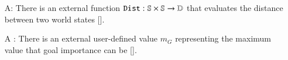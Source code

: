\begin{itemize}
    \item[A\refstepcounter{assumpnum}\theassumpnum \label{A_DistFunction}:]
    There is an external function $\mathtt{Dist} : \mathbb{S} \times
    \mathbb{S} \rightarrow \mathbb{D}$ that evaluates the distance
    between two world states [].

    \item[A\refstepcounter{assumpnum}\theassumpnum
    \label{A_MaxGoalImportanceFunction}:] There is an external user-defined
    value $m_G$ representing the maximum value that goal importance can be
    [].

\end{itemize}